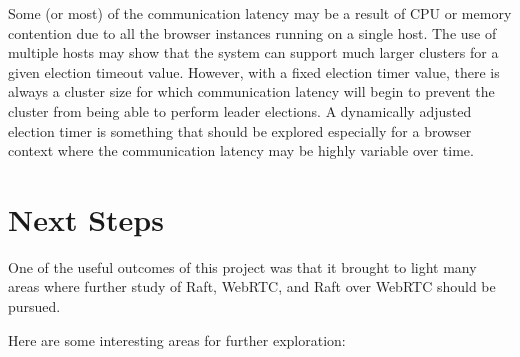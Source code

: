 \documentclass[conference,compsoc]{./IEEEtran/IEEEtran}
\begin{document}
Some (or most) of the communication latency may be a result of CPU or
memory contention due to all the browser instances running on a single
host. The use of multiple hosts may show that the system can support
much larger clusters for a given election timeout value. However, with
a fixed election timer value, there is always a cluster size for which
communication latency will begin to prevent the cluster from being
able to perform leader elections. A dynamically adjusted election
timer is something that should be explored especially for a browser
context where the communication latency may be highly variable over
time.


\section{Next Steps}

One of the useful outcomes of this project was that it brought to
light many areas where further study of Raft, WebRTC, and Raft over
WebRTC should be pursued.

Here are some interesting areas for further exploration:
\end{document}
